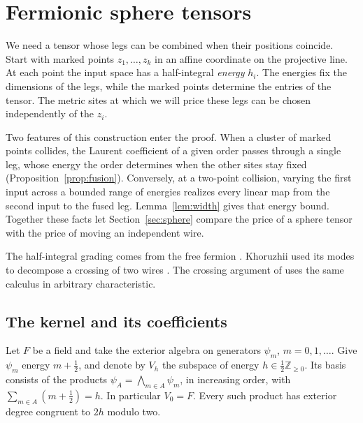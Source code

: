 \section{Fermionic sphere tensors}\label{sec:fermions}

We need a tensor whose legs can be combined when their positions
coincide. Start with marked points $z_1,\ldots,z_k$ in an affine
coordinate on the projective line. At each point the input space has a
half-integral \emph{energy} $h_i$. The energies fix the dimensions of
the legs, while the marked points determine the entries of the
tensor. The metric sites at which we will price these legs can be
chosen independently of the $z_i$.

Two features of this construction enter the proof. When a cluster of
marked points collides, the Laurent coefficient of a given order
passes through a single leg, whose energy the order determines when the other sites stay fixed
(Proposition~\ref{prop:fusion}).
Conversely, at a two-point collision, varying the first input across
a bounded range of energies realizes every linear map from the second
input to the fused leg. Lemma~\ref{lem:width} gives that energy bound.
Together these facts let Section~\ref{sec:sphere} compare the price
of a sphere tensor with the price of moving an independent wire.

The half-integral grading comes from the free fermion
\cite[Section~4]{kacwang}. Khoruzhii used its modes to decompose a
crossing of two wires \cite{Khoruzhii}. The crossing argument
of \cite[Theorem~]{oaG} uses the same calculus
in arbitrary characteristic.

\subsection{The kernel and its coefficients}
Let $F$ be a field and take the exterior algebra on generators $\psi_m$,
$m=0,1,\ldots$. Give $\psi_m$ energy $m+\tfrac12$, and denote by $V_h$
the subspace of energy $h\in\frac12\mathbb Z_{\ge0}$. Its basis consists of
the products $\psi_A=\bigwedge_{m\in A}\psi_m$, in increasing order, with
$\sum_{m\in A}(m+\tfrac12)=h$. In particular $V_0=F$. Every such product
has exterior degree congruent to $2h$ modulo two.

